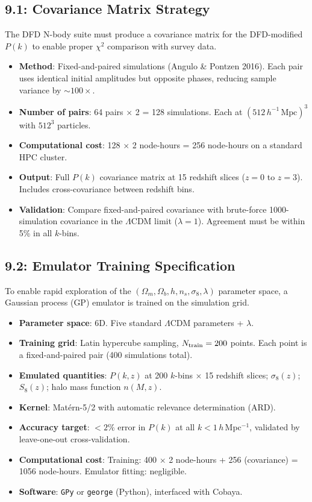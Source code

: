 \documentclass[11pt,a4paper]{article}
\begin{document}
\subsection{9.1: Covariance Matrix Strategy}

The DFD N-body suite must produce a covariance matrix for the DFD-modified $P(k)$ to enable proper $\chi^2$ comparison with survey data.

\begin{itemize}
\item \textbf{Method}: Fixed-and-paired simulations (Angulo \& Pontzen 2016). Each pair uses identical initial amplitudes but opposite phases, reducing sample variance by $\sim 100\times$.
\item \textbf{Number of pairs}: 64 pairs $\times$ 2 = 128 simulations. Each at $(512\,h^{-1}\,\text{Mpc})^3$ with $512^3$ particles.
\item \textbf{Computational cost}: 128 $\times$ 2 node-hours = 256 node-hours on a standard HPC cluster.
\item \textbf{Output}: Full $P(k)$ covariance matrix at 15 redshift slices ($z = 0$ to $z = 3$). Includes cross-covariance between redshift bins.
\item \textbf{Validation}: Compare fixed-and-paired covariance with brute-force 1000-simulation covariance in the $\Lambda$CDM limit ($\lambda = 1$). Agreement must be within 5\% in all $k$-bins.
\end{itemize}

\subsection{9.2: Emulator Training Specification}

To enable rapid exploration of the $(\Omega_m, \Omega_b, h, n_s, \sigma_8, \lambda)$ parameter space, a Gaussian process (GP) emulator is trained on the simulation grid.

\begin{itemize}
\item \textbf{Parameter space}: 6D. Five standard $\Lambda$CDM parameters + $\lambda$.
\item \textbf{Training grid}: Latin hypercube sampling, $N_{\rm train} = 200$ points. Each point is a fixed-and-paired pair (400 simulations total).
\item \textbf{Emulated quantities}: $P(k, z)$ at 200 $k$-bins $\times$ 15 redshift slices; $\sigma_8(z)$; $S_8(z)$; halo mass function $n(M, z)$.
\item \textbf{Kernel}: Mat\'ern-5/2 with automatic relevance determination (ARD).
\item \textbf{Accuracy target}: $< 2\%$ error in $P(k)$ at all $k < 1\,h\,$Mpc$^{-1}$, validated by leave-one-out cross-validation.
\item \textbf{Computational cost}: Training: 400 $\times$ 2 node-hours + 256 (covariance) = 1056 node-hours. Emulator fitting: negligible.
\item \textbf{Software}: \texttt{GPy} or \texttt{george} (Python), interfaced with Cobaya.
\end{itemize}
\end{document}
